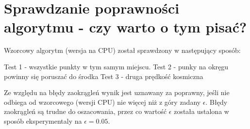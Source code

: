 \section { Sprawdzanie poprawności algorytmu - czy warto o tym pisać? }

Wzorcowy algorytm (wersja na CPU) został sprawdzony w następujący sposób:

Test 1 - wszystkie punkty w tym samym miejscu.
Test 2 - punky na okręgu powinny się poruszać do środka
Test 3 - druga prędkość kosmiczna

Ze względu na błędy zaokrągleń wynik jest uznawany za poprawny, jeśli nie odbiega od wzorcowego (wersji CPU) nie więcej niż z góry zadany $\epsilon$. Błędy zaokrągleń są trudne do oszacowania, przez co wartość $\epsilon$ została ustalona w sposób eksperymentaly na $\epsilon = 0.05$.
